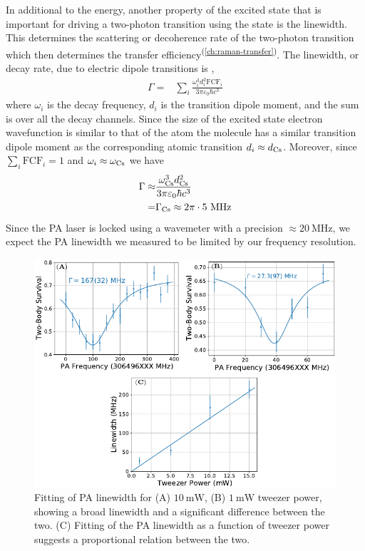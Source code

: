 In additional to the energy, another property of the excited state
that is important for driving a two-photon transition using the state is the linewidth.
This determines the scattering or decoherence rate of
the two-photon transition which then determines
the transfer efficiency\textsuperscript{(\ref{ch:raman-transfer})}.
The linewidth, or decay rate, due to electric dipole transitions is
\cite[p.~197]{bransden_physics_2003},
\begin{align*}
  \Gamma=&\sum_{i}\frac{\omega_i^3d_i^2\mathrm{FCF}_i}{3\pi\varepsilon_0\hbar c^3}
\end{align*}
where $\omega_i$ is the decay frequency, $d_i$ is the transition dipole moment,
and the sum is over all the decay channels.
Since the size of the excited state electron wavefunction is similar to that of the atom
the molecule has a similar transition dipole moment as the corresponding atomic transition
$d_i\approx d_{\mathrm{Cs}}$. Moreover, since $\sum_i\mathrm{FCF}_i=1$ and $\omega_i\approx\omega_{\mathrm{Cs}}$
we have
\begin{align*}
  \Gamma\approx&\frac{\omega_{\mathrm{Cs}}^3d_{\mathrm{Cs}}^2}{3\pi\varepsilon_0\hbar c^3}\\
  =&\Gamma_{\mathrm{Cs}}\approx2\pi\cdot5~\mathrm{MHz}
\end{align*}
Since the PA laser is locked using a wavemeter with a precision
$\approx20~\mathrm{MHz}$, we expect the PA linewidth we measured to be limited
by our frequency resolution.

\begin{figure}
  \centering
  \includegraphics[width=\textwidth]{figures/pa_linewidth_red_twr.pdf}
  \caption[PA linewidth for red detuned tweezer]{
    Fitting of PA linewidth for (A) $10~\mathrm{mW}$, (B) $1~\mathrm{mW}$ tweezer power,
    showing a broad linewidth and a significant difference between the two.
    (C) Fitting of the PA linewidth as a function of tweezer power suggests
    a proportional relation between the two.
    \label{fig:pa:linewidth:red-twr}}
\end{figure}

